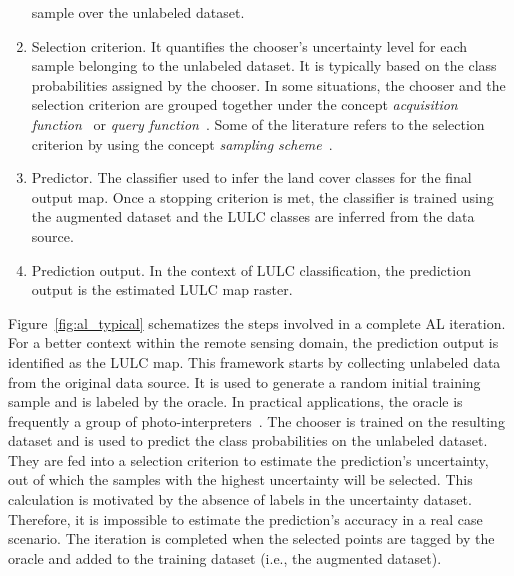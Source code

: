 \documentclass[parskip=full]{scrartcl}
\begin{document}
\begin{enumerate}
        sample over the unlabeled dataset.
    \item Selection criterion. It quantifies the chooser's uncertainty level for each sample
        belonging to the unlabeled dataset. It is typically based on the class probabilities
        assigned by the chooser. In some situations, the chooser and the selection criterion are
        grouped together under the concept \textit{acquisition function}~\cite{Ruzicka2020} or
        \textit{query function}~\cite{Su2020}. Some of the literature refers to the selection
        criterion by using the concept \textit{sampling scheme}~\cite{Liu2020}.
    \item Predictor. The classifier used to infer the land cover classes for the final output map.
        Once a stopping criterion is met, the classifier is trained using the augmented dataset and
        the LULC classes are inferred from the data source.
    \item Prediction output. In the context of LULC classification, the prediction output is the
        estimated LULC map raster.
\end{enumerate}

Figure~\ref{fig:al_typical} schematizes the steps involved in a complete AL iteration. For a better
context within the remote sensing domain, the prediction output is identified as the LULC map. This
framework starts by collecting unlabeled data from the original data source. It is used to generate
a random initial training sample and is labeled by the oracle. In practical applications, the oracle
is frequently a group of photo-interpreters~\cite{Kottke2017}. The chooser is trained on the
resulting dataset and is used to predict the class probabilities on the unlabeled dataset. They are
fed into a selection criterion to estimate the prediction's uncertainty, out of which the samples
with the highest uncertainty will be selected. This calculation is motivated by the absence of
labels in the uncertainty dataset. Therefore, it is impossible to estimate the prediction's accuracy
in a real case scenario. The iteration is completed when the selected points are tagged by the
oracle and added to the training dataset (i.e., the augmented dataset). 
\end{document}
